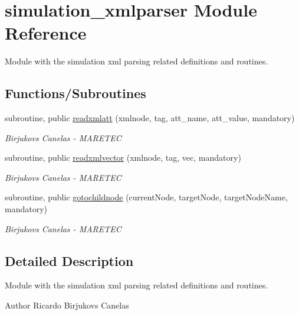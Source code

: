 \hypertarget{namespacesimulation__xmlparser}{}\section{simulation\+\_\+xmlparser Module Reference}
\label{namespacesimulation__xmlparser}


Module with the simulation xml parsing related definitions and routines.  


\subsection*{Functions/\+Subroutines}
\begin{DoxyCompactItemize}
\item 
subroutine, public \mbox{\hyperlink{namespacesimulation__xmlparser_ae5a51c63402f76781f333aead6d1084d}{readxmlatt}} (xmlnode, tag, att\+\_\+name, att\+\_\+value, mandatory)
\begin{DoxyCompactList}\small\item\em Birjukovs Canelas -\/ M\+A\+R\+E\+T\+EC \end{DoxyCompactList}\item 
subroutine, public \mbox{\hyperlink{namespacesimulation__xmlparser_aa20b02586a497ea7ef90cb5b05cb2af7}{readxmlvector}} (xmlnode, tag, vec, mandatory)
\begin{DoxyCompactList}\small\item\em Birjukovs Canelas -\/ M\+A\+R\+E\+T\+EC \end{DoxyCompactList}\item 
subroutine, public \mbox{\hyperlink{namespacesimulation__xmlparser_a9a66c3a491ca567688fef7148e2d12d8}{gotochildnode}} (current\+Node, target\+Node, target\+Node\+Name, mandatory)
\begin{DoxyCompactList}\small\item\em Birjukovs Canelas -\/ M\+A\+R\+E\+T\+EC \end{DoxyCompactList}\end{DoxyCompactItemize}


\subsection{Detailed Description}
Module with the simulation xml parsing related definitions and routines. 

\begin{DoxyAuthor}{Author}
Ricardo Birjukovs Canelas 
\end{DoxyAuthor}



